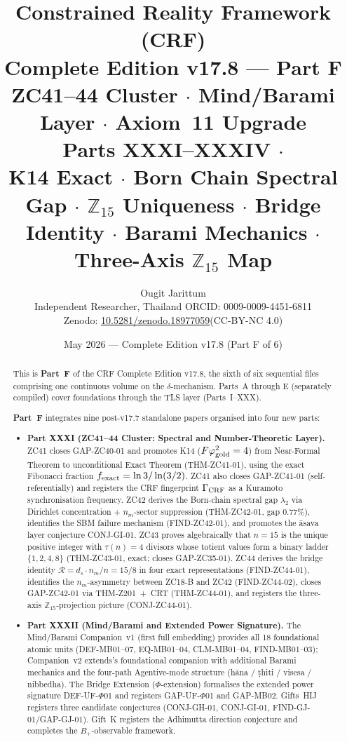 \documentclass[12pt, a4paper]{article}
\title{%
  \textbf{\color{deepblue}Constrained Reality Framework (CRF)}\\[0.4em]
  \large Complete Edition v17.8 --- Part F\\
  \large ZC41--44 Cluster $\cdot$ Mind/Barami Layer $\cdot$
    Axiom~11 Upgrade\\[0.3em]
  \normalsize\color{mutedgray}
  Parts XXXI--XXXIV $\cdot$\\
  K14 Exact $\cdot$ Born Chain Spectral Gap $\cdot$
  $\mathbb{Z}_{15}$ Uniqueness $\cdot$ Bridge Identity $\cdot$
  Barami Mechanics $\cdot$ Three-Axis $\mathbb{Z}_{15}$ Map
}
\author{Ougit Jarittum\\
\small Independent Researcher, Thailand\quad
ORCID: 0009-0009-4451-6811\\
\small Zenodo: \href{https://doi.org/10.5281/zenodo.18977059}%
{10.5281/zenodo.18977059}\quad (CC-BY-NC 4.0)
}
\date{May 2026 --- Complete Edition v17.8 (Part F of 6)}
\begin{document}

\maketitle

\begin{abstract}
\sloppy
This is \textbf{Part~F} of the CRF Complete Edition v17.8, the sixth
of six sequential files comprising one continuous volume on the
$\delta$-mechanism. Parts~A through E (separately compiled) cover
foundations through the TLS layer (Parts~I--XXX).

\textbf{Part~F} integrates nine post-v17.7 standalone papers
organised into four new parts:

\begin{itemize}[leftmargin=2em]
\item \textbf{Part XXXI (ZC41--44 Cluster: Spectral and
  Number-Theoretic Layer).}
ZC41 closes GAP-ZC40-01 and promotes K14 ($F\varphi_{\rm gold}^2 = 4$)
from Near-Formal Theorem to unconditional Exact Theorem
(THM-ZC41-01), using the exact Fibonacci fraction
$f_{\rm exact} = \ln 3 / \ln(3/2)$.
ZC41 also closes GAP-ZC41-01 (self-referentially) and registers
the CRF fingerprint $\Gamma_{\rm CRF}$ as a Kuramoto synchronisation
frequency.
ZC42 derives the Born-chain spectral gap $\lambda_2$ via
Dirichlet concentration + $n_m$-sector suppression (THM-ZC42-01,
gap 0.77\%), identifies the SBM failure mechanism (FIND-ZC42-01),
and promotes the \={a}sava layer conjecture CONJ-GI-01.
ZC43 proves algebraically that $n = 15$ is the unique positive
integer with $\tau(n) = 4$ divisors whose totient values form a
binary ladder $\{1,2,4,8\}$ (THM-ZC43-01, exact; closes GAP-ZC35-01).
ZC44 derives the bridge identity
$\mathcal{R} = d_s \cdot n_m / n = 15/8$ in four exact representations
(FIND-ZC44-01), identifies the $n_m$-asymmetry between ZC18-B and
ZC42 (FIND-ZC44-02), closes GAP-ZC42-01 via THM-Z201~+~CRT
(THM-ZC44-01), and registers the three-axis
$\mathbb{Z}_{15}$-projection picture (CONJ-ZC44-01).

\item \textbf{Part XXXII (Mind/Barami and Extended Power
  Signature).}
The Mind/Barami Companion~v1 (first full embedding) provides all 18 foundational atomic units (DEF-MB01--07, EQ-MB01--04, CLM-MB01--04, FIND-MB01--03); Companion~v2 extends's foundational
companion with additional Barami mechanics and the four-path
Ag\-en\-tive-mode structure (h\={a}na / \d{t}hiti / visesa /
nibbedha). The Bridge Extension ($\Phi$-extension) formalises the
extended power signature DEF-UF-$\Phi$01 and registers
GAP-UF-$\Phi$01 and GAP-MB02. Gifts~HIJ registers three candidate
conjectures (CONJ-GH-01, CONJ-GI-01, FIND-GJ-01/GAP-GJ-01).
Gift~K registers the Adhimutta direction conjecture and completes
the $B_+$-observable framework.


\end{itemize}
\end{abstract}
\end{document}
